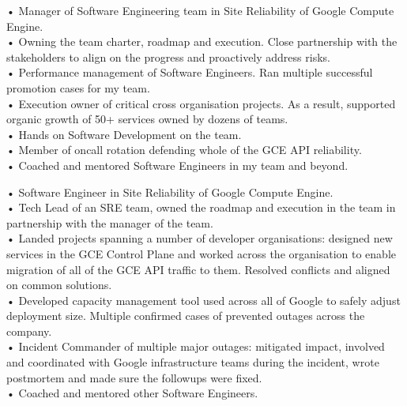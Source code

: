 \documentclass[11pt,a4paper]{moderncv-xetex}
\begin{document}
\maketitle

{• Manager of Software Engineering team in Site Reliability of Google Compute Engine.
\\
• Owning the team charter, roadmap and execution. Close partnership with the stakeholders to align on the progress and proactively address risks.
\\
• Performance management of Software Engineers. Ran multiple successful promotion cases for my team.
\\
• Execution owner of critical cross organisation projects. As a result, supported organic growth of 50+ services owned by dozens of teams.
\\
• Hands on Software Development on the team.
\\
• Member of oncall rotation defending whole of the GCE API reliability.
\\
• Coached and mentored Software Engineers in my team and beyond.
}

{
• Software Engineer in Site Reliability of Google Compute Engine.
\\
• Tech Lead of an SRE team, owned the roadmap and execution in the team in partnership with the manager of the team.
\\
• Landed projects spanning a number of developer organisations: designed new services in the GCE Control Plane and worked across the organisation to enable migration of all of the GCE API traffic to them. Resolved conflicts and aligned on common solutions.
\\
• Developed capacity management tool used across all of Google to safely adjust deployment size. Multiple confirmed cases of prevented outages across the company.
\\
• Incident Commander of multiple major outages: mitigated impact, involved and coordinated with Google infrastructure teams during the incident, wrote postmortem and made sure the followups were fixed.
\\
• Coached and mentored other Software Engineers.
}
\end{document}
